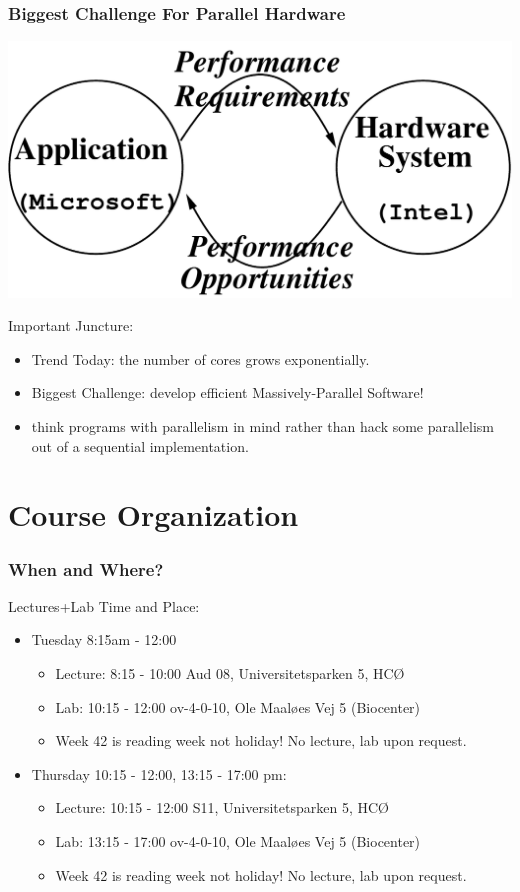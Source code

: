 \documentclass{beamer}
\renewcommand{\emph}[1]{\textcolor{structure}{#1}}
\newcommand{\emp}[1]{\textcolor{DikuRed}{ #1}}
\begin{document}
\begin{frame}[fragile,t]
\frametitle{Biggest Challenge For Parallel Hardware}

\bigskip

\includegraphics[width=29ex]{Figures/L1/Synergy}
\bigskip\pause


\emp{Important Juncture:}\medskip
\begin{itemize}
            \item \emph{Trend Today: the number of cores grows exponentially.}\medskip
            \item \alert{Biggest Challenge: develop efficient Massively-Parallel Software!}\medskip
            \item think programs with parallelism in mind rather 
                    than hack \alert{some} parallelism out of a sequential implementation.
\end  {itemize}
\end{frame}


\section{Course Organization}

\begin{frame}[fragile]
	\tableofcontents[currentsection]
\end{frame}

\begin{frame}[fragile]
\frametitle{When and Where?}
    Lectures+Lab Time and Place:\bigskip
    \begin{itemize}
        \item Tuesday 8:15am - 12:00\medskip
            \begin{itemize}
                \item Lecture:  8:15 - 10:00  Aud 08, Universitetsparken 5, HCØ
                \item Lab:     10:15 - 12:00  ov-4-0-10, Ole Maaløes Vej 5 (Biocenter)
                \item Week 42 is reading week not holiday! No lecture, lab upon request.
            \end{itemize}\bigskip
        \item Thursday 10:15 - 12:00, 13:15 - 17:00 pm:\medskip
            \begin{itemize}
                \item Lecture: 10:15 - 12:00  S11, Universitetsparken 5, HCØ
                \item Lab:     13:15 - 17:00  ov-4-0-10, Ole Maaløes Vej 5 (Biocenter)
                \item Week 42 is reading week not holiday! No lecture, lab upon request.
            \end{itemize}
    \end{itemize}  
\end{frame}
\end{document}
